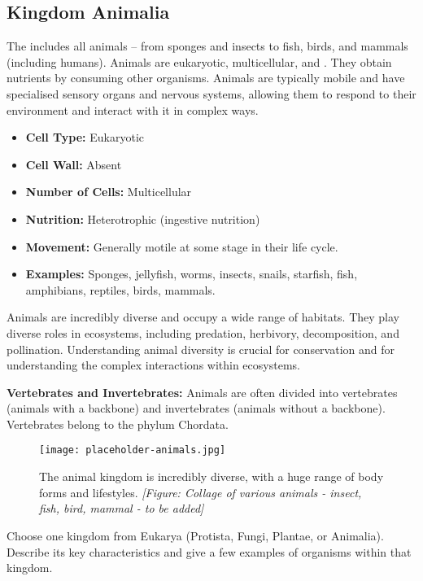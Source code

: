 \subsection{Kingdom Animalia}

The  includes all animals – from sponges and insects to fish, birds, and mammals (including humans). Animals are eukaryotic, multicellular, and . They obtain nutrients by consuming other organisms. Animals are typically mobile and have specialised sensory organs and nervous systems, allowing them to respond to their environment and interact with it in complex ways.

\begin{itemize}
    \item \textbf{Cell Type:} Eukaryotic
    \item \textbf{Cell Wall:} Absent
    \item \textbf{Number of Cells:} Multicellular
    \item \textbf{Nutrition:} Heterotrophic (ingestive nutrition)
    \item \textbf{Movement:} Generally motile at some stage in their life cycle.
    \item \textbf{Examples:} Sponges, jellyfish, worms, insects, snails, starfish, fish, amphibians, reptiles, birds, mammals.
\end{itemize}

Animals are incredibly diverse and occupy a wide range of habitats. They play diverse roles in ecosystems, including predation, herbivory, decomposition, and pollination.  Understanding animal diversity is crucial for conservation and for understanding the complex interactions within ecosystems.

\begin{marginnote}
\textbf{Vertebrates and Invertebrates:} Animals are often divided into vertebrates (animals with a backbone) and invertebrates (animals without a backbone). Vertebrates belong to the phylum Chordata.
\end{marginnote}

\begin{figure}
\centering
\texttt{[image: placeholder-animals.jpg]}
\caption{The animal kingdom is incredibly diverse, with a huge range of body forms and lifestyles. \textit{[Figure: Collage of various animals - insect, fish, bird, mammal - to be added]}}
\end{figure}


\begin{stopandthink}
Choose one kingdom from Eukarya (Protista, Fungi, Plantae, or Animalia).  Describe its key characteristics and give a few examples of organisms within that kingdom.
\end{stopandthink}



